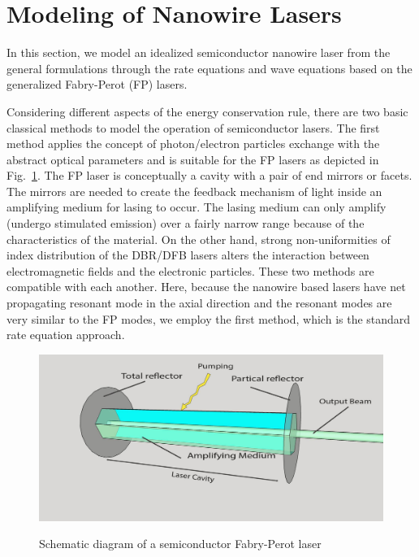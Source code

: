 \section{Modeling of Nanowire Lasers} \label{SLModeling}

%
In this section, we model an idealized semiconductor nanowire laser from the
general formulations through the rate equations and wave equations based on the
generalized Fabry-Perot (FP) lasers.

Considering different aspects of the energy conservation rule, there are two
basic classical methods to model the operation of semiconductor lasers. The
first method applies the concept of photon/electron particles exchange with the
abstract optical parameters and is suitable for the FP lasers as depicted in
Fig.~\ref{FPLasingMechanism}. The FP laser is conceptually a cavity with a pair
of end mirrors or facets. The mirrors are needed to create the feedback
mechanism of light inside an amplifying medium for lasing to occur. The lasing
medium can only amplify (undergo stimulated emission) over a fairly narrow
range because of the characteristics of the material. On the other hand, strong
non-uniformities of index distribution of the DBR/DFB lasers alters the
interaction between electromagnetic fields and the electronic particles. These
two methods are compatible with each another. Here, because the nanowire based
lasers have net propagating resonant mode in the axial direction and the
resonant modes are very similar to the FP modes, we employ the first method,
which is the standard rate equation approach.

\begin{figure}
  \caption{Schematic diagram of a semiconductor Fabry-Perot laser}
  \centering
  \includegraphics[width=\textwidth]{pictures/LT/FPLasingMechanism}
  \label{FPLasingMechanism}
\end{figure}

